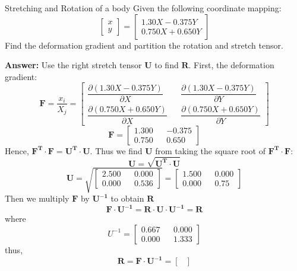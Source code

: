 \begin{example}{Stretching and Rotation of a body}
    Given the following coordinate mapping:
    $$
        \begin{bmatrix}
            x \\ y
        \end{bmatrix}
        = \begin{bmatrix}
            1.30X - 0.375Y \\
            0.750X + 0.650Y
        \end{bmatrix}
    $$
    Find the deformation gradient and partition the rotation and stretch tensor.
    
    \textbf{Answer: } Use the right stretch tensor $\mathbf{U}$ to find $\mathbf{R}$. First, the deformation gradient:
    $$
        \mathbf{F}=\dfrac{x_i}{X_j}=\begin{bmatrix}
            \dfrac{\partial (1.30X - 0.375Y)}{\partial X} && \dfrac{\partial (1.30X - 0.375Y)}{\partial Y}\\
            \dfrac{\partial (0.750X + 0.650Y)}{\partial X} && \dfrac{\partial (0.750X + 0.650Y)}{\partial Y}
        \end{bmatrix}
    $$
    $$
        \mathbf{F}=\begin{bmatrix}
            1.300 && -0.375 \\
            0.750 && 0.650
        \end{bmatrix}
    $$
    Hence, $\mathbf{F^T \cdot F = U^T \cdot U }$. Thus we find $\mathbf{U}$ from taking the square root of $\mathbf{F^T \cdot F}$:
    $$
        \mathbf{U = \sqrt{U^T \cdot U}}
    $$
    $$
        \mathbf{U} = \sqrt{\begin{bmatrix}
            2.500 && 0.000 \\
            0.000 && 0.536
        \end{bmatrix}
        } = \begin{bmatrix}
            1.500 && 0.000 \\
            0.000 && 0.75
        \end{bmatrix}
    $$
    Then we multiply $\mathbf{F}$ by $\mathbf{U^{-1}}$ to obtain $\mathbf{R}$
    $$
        \mathbf{F \cdot U^{-1} = R \cdot U \cdot U^{-1} = R}
    $$
    where 
    $$
        U^{-1} = \begin{bmatrix}
            0.667 && 0.000 \\
            0.000 && 1.333
        \end{bmatrix}
    $$
    thus,
    $$
        \mathbf{R = F \cdot U^{-1} = \begin{bmatrix}

\end{bmatrix}}$$
\end{example}
